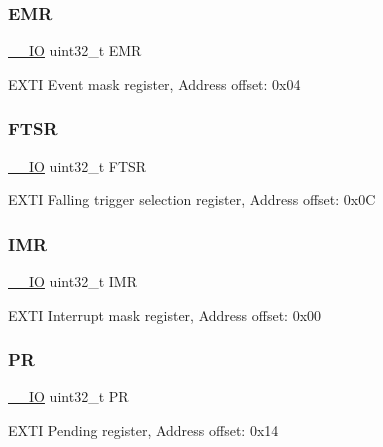 \subsubsection{\texorpdfstring{E\+MR}{EMR}}
{\footnotesize\ttfamily \hyperlink{core__sc300_8h_aec43007d9998a0a0e01faede4133d6be}{\+\_\+\+\_\+\+IO} uint32\+\_\+t E\+MR}

E\+X\+TI Event mask register, Address offset\+: 0x04 \mbox{\label{struct_e_x_t_i___type_def_aa0f7c828c46ae6f6bc9f66f11720bbe6}} 
\subsubsection{\texorpdfstring{F\+T\+SR}{FTSR}}
{\footnotesize\ttfamily \hyperlink{core__sc300_8h_aec43007d9998a0a0e01faede4133d6be}{\+\_\+\+\_\+\+IO} uint32\+\_\+t F\+T\+SR}

E\+X\+TI Falling trigger selection register, Address offset\+: 0x0C \mbox{\label{struct_e_x_t_i___type_def_ae845b86e973b4bf8a33c447c261633f6}} 
\subsubsection{\texorpdfstring{I\+MR}{IMR}}
{\footnotesize\ttfamily \hyperlink{core__sc300_8h_aec43007d9998a0a0e01faede4133d6be}{\+\_\+\+\_\+\+IO} uint32\+\_\+t I\+MR}

E\+X\+TI Interrupt mask register, Address offset\+: 0x00 \mbox{\label{struct_e_x_t_i___type_def_af8d25514079514d38c104402f46470af}} 
\subsubsection{\texorpdfstring{PR}{PR}}
{\footnotesize\ttfamily \hyperlink{core__sc300_8h_aec43007d9998a0a0e01faede4133d6be}{\+\_\+\+\_\+\+IO} uint32\+\_\+t PR}

E\+X\+TI Pending register, Address offset\+: 0x14 \mbox{\label{struct_e_x_t_i___type_def_a0d952a17455687d6e9053730d028fa1d}} 

